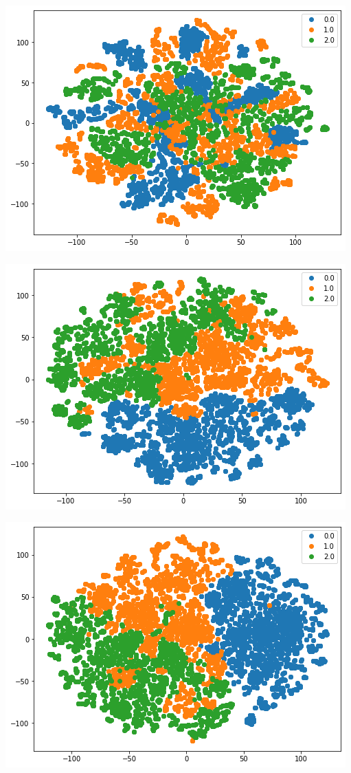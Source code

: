\documentclass[11pt]{article}
\begin{document}
\begin{center}
    \begin{minipage}{0.3\linewidth}
    \includegraphics[width=\linewidth]{04.png}
    \end{minipage}
    \begin{minipage}{0.3\linewidth}
    \includegraphics[width=\linewidth]{05.png}
    \end{minipage}
    \begin{minipage}{0.3\linewidth}
    \includegraphics[width=\linewidth]{06.png}

\end{minipage}
\end{center}
\end{document}
